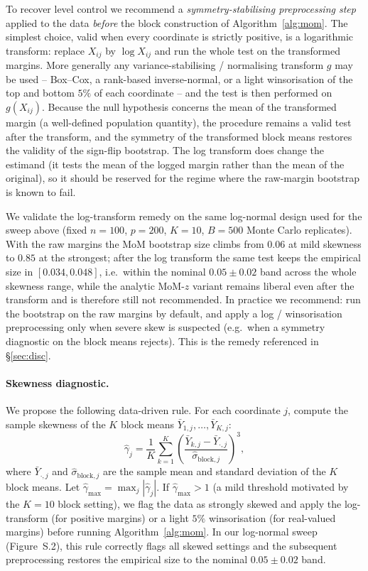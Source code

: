 \documentclass[pdflatex,sn-mathphys-num]{sn-jnl}
\theoremstyle{thmstyleone}%
\theoremstyle{thmstyletwo}%
\theoremstyle{thmstylethree}%
\begin{document}
To recover level control we recommend a \emph{symmetry-stabilising preprocessing
step} applied to the data \emph{before} the block construction of
Algorithm~\ref{alg:mom}. The simplest choice, valid when every coordinate is
strictly positive, is a logarithmic transform: replace $X_{ij}$ by
$\log X_{ij}$ and run the whole test on the transformed margins. More generally
any variance-stabilising / normalising transform $g$ may be used -- Box--Cox, a
rank-based inverse-normal, or a light winsorisation of the top and bottom $5\%$ of
each coordinate -- and the test is then performed on $g(X_{ij})$. Because the null
hypothesis concerns the mean of the transformed margin (a well-defined population
quantity), the procedure remains a valid test after the transform, and the
symmetry of the transformed block means restores the validity of the sign-flip
bootstrap. The log transform does change the estimand (it tests the mean of the
logged margin rather than the mean of the original), so it should be reserved for
the regime where the raw-margin bootstrap is known to fail.

We validate the log-transform remedy on the same log-normal design used for the
sweep above (fixed $n=100$, $p=200$, $K=10$, $B=500$ Monte Carlo replicates).
With the raw margins the MoM bootstrap size climbs from $0.06$ at mild skewness to
$0.85$ at the strongest; after the log transform the same test keeps the
empirical size in $[0.034,0.048]$, i.e.\ within the nominal $0.05\pm0.02$ band
across the whole skewness range, while the analytic MoM-$z$ variant remains
liberal even after the transform and is therefore still not recommended. In
practice we recommend: run the bootstrap on the raw margins by default, and apply
a log / winsorisation preprocessing only when severe skew is suspected (e.g.\ when
a symmetry diagnostic on the block means rejects). This is the remedy referenced
in \S\ref{sec:disc}.

\paragraph{Skewness diagnostic.}
We propose the following data-driven rule. For each coordinate $j$, compute the
sample skewness of the $K$ block means $\bar Y_{1,j},\dots,\bar Y_{K,j}$:
\[
\hat\gamma_j
 = \frac{1}{K}\sum_{k=1}^{K}
   \left(\frac{\bar Y_{k,j}-\bar Y_{\cdot,j}}
              {\hat\sigma_{\mathrm{block},j}}\right)^{3},
\]
where $\bar Y_{\cdot,j}$ and $\hat\sigma_{\mathrm{block},j}$ are the sample mean and
standard deviation of the $K$ block means. Let
$\hat\gamma_{\max}=\max_j|\hat\gamma_j|$. If $\hat\gamma_{\max}>1$ (a mild
threshold motivated by the $K=10$ block setting), we flag the data as strongly
skewed and apply the log-transform (for positive margins) or a light $5\%$
winsorisation (for real-valued margins) before running Algorithm~\ref{alg:mom}.
In our log-normal sweep (Figure~S.2), this rule correctly flags all skewed
settings and the subsequent preprocessing restores the empirical size to the
nominal $0.05\pm0.02$ band.
\end{document}
